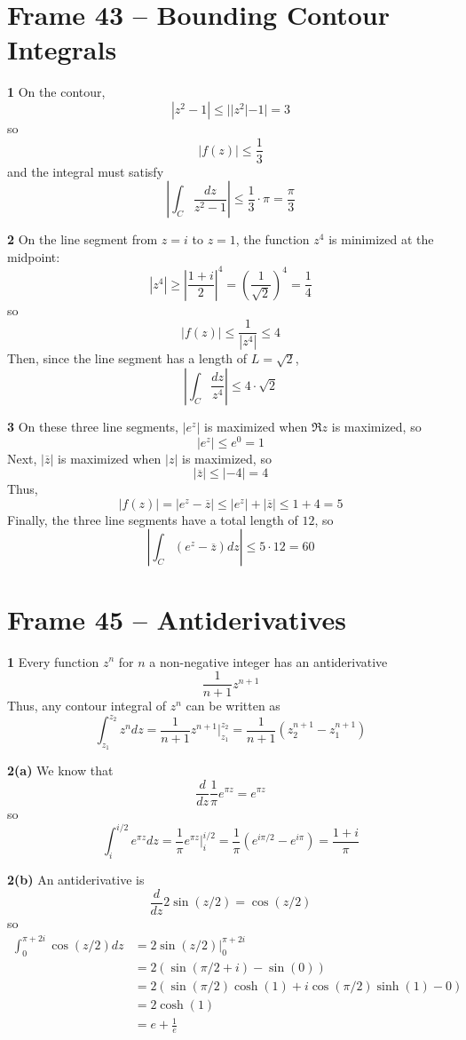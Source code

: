 \documentclass{article}
\renewcommand{\bar}{\overline}
\begin{document}
\clearpage
\section{Frame 43 -- Bounding Contour Integrals}
\textbf{1}
On the contour,
\[
	|z^2 - 1| \le ||z^2| - 1| = 3
\]
so
\[
	|f(z)| \le \frac{1}{3}
\]
and the integral must satisfy
\[
	\left| \int_C \frac{dz}{z^2 - 1} \right| \le \frac{1}{3} \cdot \pi = \frac{\pi}{3} 
\]


\textbf{2}
On the line segment from $z = i$ to $z = 1$, the function $z^4$ is minimized at the midpoint:
\[
	|z^4| 
	\ge \left| \frac{1 + i}{2} \right|^4 
	= \left(\frac{1}{\sqrt{2}} \right)^4
	= \frac{1}{4}
\]
so
\[
	|f(z)| 
	\le \frac{1}{|z^4|}
	\le 4
\]
Then, since the line segment has a length of $L = \sqrt{2}$,
\[
	\left| \int_C \frac{dz}{z^4} \right| \le 4 \cdot \sqrt{2}
\]


\textbf{3}
On these three line segments, $|e^z|$ is maximized when $\Re z$ is maximized, so
\[
	| e^z | \le e^0 = 1
\]
Next, $|\bar{z}|$ is maximized when $|z|$ is maximized, so
\[
	| \bar{z} | \le | -4 | = 4
\]
Thus,
\[
	|f(z)|
	= |e^z - \bar{z}|
	\le |e^z| + |\bar{z}|
	\le 1 + 4
	= 5
\]
Finally, the three line segments have a total length of $12$, so
\[
	\left| \int_C (e^z - \bar{z}) dz \right| \le 5 \cdot 12 = 60
\]


\clearpage
\section{Frame 45 -- Antiderivatives}
\textbf{1}
Every function $z^n$ for $n$ a non-negative integer has an antiderivative
\[
	\frac{1}{n+1} z^{n+1}
\]
Thus, any contour integral of $z^n$ can be written as
\[
	\int_{z_1}^{z_2} z^n dz 
	= \frac{1}{n+1} z^{n+1} \Big|_{z_1}^{z_2}
	= \frac{1}{n+1} (z_2^{n+1} - z_1^{n+1})
\]

\textbf{2(a)}
We know that
\[
	\frac{d}{dz} \frac{1}{\pi} e^{\pi z} = e^{\pi z}
\]
so
\[
	\int_i^{i/2} e^{\pi z} dz
	= \frac{1}{\pi} e^{\pi z} \Big|_i^{i/2}
	= \frac{1}{\pi} (e^{i \pi/2} - e^{i \pi})
	= \frac{1 + i}{\pi}
\]

\textbf{2(b)}
An antiderivative is
\[
	\frac{d}{dz} 2\sin(z / 2) = \cos(z / 2)
\]
so
\begin{align*}
	\int_0^{\pi + 2i} \cos(z/2) dz
	&= 2\sin(z/2) \Big|_0^{\pi + 2i} \\
	&= 2 (\sin(\pi/2 + i) - \sin(0)) \\
	&= 2 (\sin(\pi/2) \cosh(1) + i\cos(\pi/2) \sinh(1) - 0) \\
	&= 2 \cosh (1) \\
	&= e + \frac{1}{e}
\end{align*}
\end{document}
